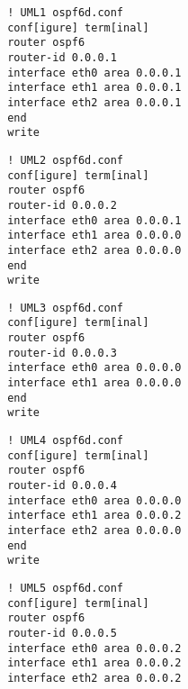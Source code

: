 \begin{verbatim}
 ! UML1 ospf6d.conf
 conf[igure] term[inal]
 router ospf6
 router-id 0.0.0.1
 interface eth0 area 0.0.0.1
 interface eth1 area 0.0.0.1
 interface eth2 area 0.0.0.1
 end
 write
\end{verbatim}

\begin{verbatim}
 ! UML2 ospf6d.conf
 conf[igure] term[inal]
 router ospf6
 router-id 0.0.0.2
 interface eth0 area 0.0.0.1
 interface eth1 area 0.0.0.0
 interface eth2 area 0.0.0.0
 end
 write
\end{verbatim}

\begin{verbatim}
 ! UML3 ospf6d.conf
 conf[igure] term[inal]
 router ospf6
 router-id 0.0.0.3
 interface eth0 area 0.0.0.0
 interface eth1 area 0.0.0.0
 end
 write
\end{verbatim}

\begin{verbatim}
 ! UML4 ospf6d.conf
 conf[igure] term[inal]
 router ospf6
 router-id 0.0.0.4
 interface eth0 area 0.0.0.0
 interface eth1 area 0.0.0.2
 interface eth2 area 0.0.0.0
 end
 write
\end{verbatim}

\begin{verbatim}
 ! UML5 ospf6d.conf
 conf[igure] term[inal]
 router ospf6
 router-id 0.0.0.5
 interface eth0 area 0.0.0.2
 interface eth1 area 0.0.0.2
 interface eth2 area 0.0.0.2
\end{verbatim}
